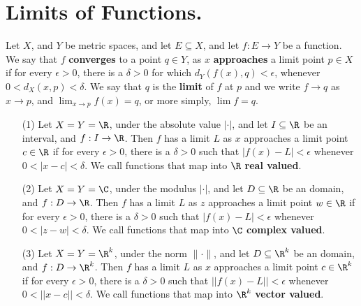 
\section{Limits of Functions.}

\begin{definition}
    Let $X$, and  $Y$ be metric spaces, and let  $E \subseteq X$, and let  $f:E \rightarrow Y$ be a
    function. We say that $f$ \textbf{converges} to a point $q \in Y$, as $x$ \textbf{approaches} a
    limit point $p \in X$ if for every  $\epsilon>0$, there is a  $\delta>0$ for which
    $d_Y(f(x),q)<\epsilon$, whenever $0<d_X(x,p)<\delta$. We say that  $q$ is the  \textbf{limit} of $f$
    at  $p$ and we write  $f \rightarrow q$ as  $x \rightarrow p$, and  $\lim_{x \rightarrow p}{f(x)}=q$, or more
    simply, $\lim{f}=q$.
\end{definition}

\begin{example}
    \begin{enumerate}
        \item[(1)] Let $X=Y=\R$, under the absolute value  $|\cdot|$, and let  $I \subseteq \R$ be
            an interval, and $f:I \rightarrow \R$. Then  $f$ has a limit  $L$ as  $x$ approaches
            a limit point  $c \in \R$ if for every  $\epsilon>0$, there is a  $\delta>0$ such that
            $|f(x)-L|<\epsilon$ whenever  $0<|x-c|<\delta$. We call functions that map into $\R$
            \textbf{real valued}.

        \item[(2)] Let $X=Y=\C$, under the modulus  $|\cdot|$, and let  $D \subseteq \R$ be
            an domain, and $f:D \rightarrow \R$. Then  $f$ has a limit  $L$ as  $z$ approaches
            a limit point  $w \in \R$ if for every  $\epsilon>0$, there is a  $\delta>0$ such that
            $|f(x)-L|<\epsilon$ whenever  $0<|z-w|<\delta$. We call functions that map into $\C$
            \textbf{complex valued}.

        \item[(3)] Let $X=Y=\R^k$, under the norm  $\|\cdot\|$, and let  $D \subseteq \R^k$ be
            an domain, and $f:D \rightarrow \R^k$. Then  $f$ has a limit  $L$ as  $x$ approaches
            a limit point  $c \in \R^k$ if for every  $\epsilon>0$, there is a  $\delta>0$ such that
            $||f(x)-L||<\epsilon$ whenever  $0<||x-c||<\delta$. We call functions that map into $\R^k$
            \textbf{vector valued}.
    \end{enumerate}
\end{example}

